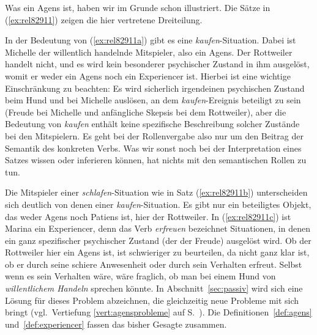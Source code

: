 \Enl

Was ein Agens ist, haben wir im Grunde schon illustriert.
Die Sätze in (\ref{ex:rel82911}) zeigen die hier vertretene Dreiteilung.

\begin{exe}
  \ex\label{ex:rel82911} 
  \begin{xlist}
  \end{xlist}
\end{exe}

In der Bedeutung von (\ref{ex:rel82911a}) gibt es eine \textit{kaufen}-Situation.
Dabei ist Michelle der willentlich handelnde Mitspieler, also ein Agens.
Der Rottweiler handelt nicht, und es wird kein besonderer psychischer Zustand in ihm ausgelöst, womit er weder ein Agens noch ein Experiencer ist.
Hierbei ist eine wichtige Einschränkung zu beachten: Es wird sicherlich irgendeinen psychischen Zustand beim Hund und bei Michelle auslösen, an dem \textit{kaufen}-Ereignis beteiligt zu sein (\zB Freude bei Michelle und anfängliche Skepsis bei dem Rottweiler), aber die Bedeutung von \textit{kaufen} enthält keine spezifische Beschreibung solcher Zustände bei den Mitspielern.
Es geht bei der Rollenvergabe also nur um den Beitrag der Semantik des konkreten Verbs.
Was wir sonst noch bei der Interpretation eines Satzes wissen oder inferieren können, hat nichts mit den semantischen Rollen zu tun.

Die Mitspieler einer \textit{schlafen}-Situation wie in Satz (\ref{ex:rel82911b}) unterscheiden sich deutlich von denen einer \textit{kaufen}-Situation.
Es gibt nur ein beteiligtes Objekt, das weder Agens noch Patiens ist, hier der Rottweiler.
In (\ref{ex:rel82911c}) ist Marina ein Experiencer, denn das Verb \textit{erfreuen} bezeichnet Situationen, in denen ein ganz spezifischer psychischer Zustand (der der Freude) ausgelöst wird.
Ob der Rottweiler hier ein Agens ist, ist schwieriger zu beurteilen, da nicht ganz klar ist, ob er durch seine schiere Anwesenheit oder durch sein Verhalten erfreut.
Selbst wenn es sein Verhalten wäre, wäre fraglich, ob man bei einem Hund von \textit{willentlichem Handeln} sprechen könnte.
In Abschnitt~\ref{sec:passiv} wird sich eine Lösung für dieses Problem abzeichnen, die gleichzeitig neue Probleme mit sich bringt (vgl.\ Vertiefung \ref{vert:agensprobleme} auf S.~\pageref{vert:agensprobleme}).
Die Definitionen~\ref{def:agens} und~\ref{def:experiencer} fassen das bisher Gesagte zusammen.

